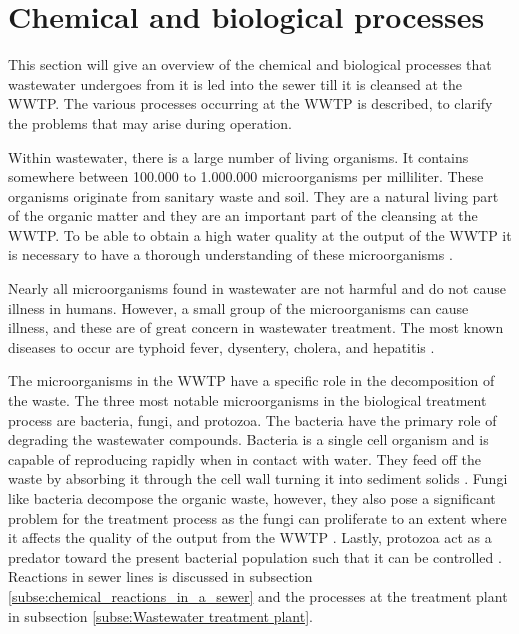 \section{Chemical and biological processes}\label{se:chemical_process}
This section will give an overview of the chemical and biological processes that wastewater undergoes from it is led into the sewer till it is cleansed at the WWTP. The various processes occurring at the WWTP is described, to clarify the problems that may arise during operation. 

Within wastewater, there is a large number of living organisms.%
 It contains somewhere between 100.000 to 1.000.000 microorganisms per milliliter. These organisms originate from sanitary waste and soil. They are a natural living part of the organic matter and they are an important part of the cleansing at the WWTP. To be able to obtain a high water quality at the output of the WWTP it is necessary to have a thorough understanding of these microorganisms \cite{biological_wastewater}. %

Nearly all microorganisms found in wastewater are not harmful and do not cause illness in humans. However, a small group of the microorganisms can cause illness, and these are of great concern in wastewater treatment. The most known diseases to occur are typhoid fever, dysentery, cholera, and hepatitis \cite{biological_wastewater}.

The microorganisms in the WWTP have a specific role in the decomposition of the waste. The three most notable microorganisms in the biological treatment process are bacteria, fungi, and protozoa. The bacteria have the primary role of degrading the wastewater compounds.  Bacteria is a single cell organism and is capable of reproducing rapidly when in contact with water. They feed off the waste by absorbing it through the cell wall turning it into sediment solids \cite{biological_wastewater}. 
Fungi like bacteria decompose the organic waste, however, they also pose a significant problem for the treatment process as the fungi can proliferate to an extent where it affects the quality of the output from the WWTP \cite{fungi_source}. 
Lastly, protozoa act as a predator toward the present bacterial population such that it can be controlled \cite{biological_wastewater}. Reactions in sewer lines is discussed in subsection \ref{subse:chemical_reactions_in_a_sewer} and the processes at the treatment plant in subsection \ref{subse:Wastewater treatment plant}.

